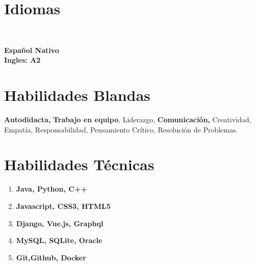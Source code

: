 \documentclass[american]{cv-class}
\begin{document}
\begin{aside}
    
    \section{Idiomas}
    \\
    \begin{small}
    \textbf{Español Nativo}
    \\
    \textbf{Ingles: A2 }

    \end{small}
	
\section{Habilidades Blandas}

	\justifying
   \begin{small}
   \textbf{Autodidacta,}
    	{ \textbf{Trabajo en equipo}, Liderazgo, \textbf{Comunicación,} Creatividad, Empatía, Responsabilidad, Pensamiento Crítico, Resolución de Problemas.
    	}
    \end{small}
    
\section{Habilidades Técnicas}

	\justifying
    \begin{enumerate}
    
    \item \textbf{Java, Python, C++ }
    \item  \textbf{Javascript, CSS3, HTML5}
    \item  \textbf{Django, Vue.js, Graphql}
    \item  \textbf{MySQL, SQLite, Oracle}
    \item \textbf{Git,Github, Docker}
    
    \end{enumerate}
\end{aside}

 

\end{document}
